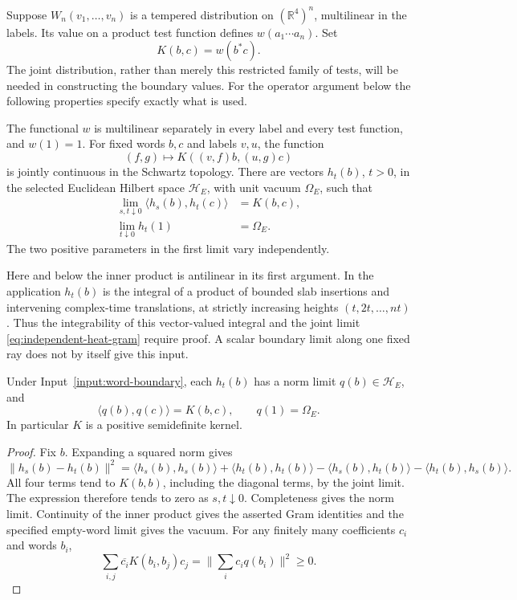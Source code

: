 Suppose $W_n(v_1,\ldots,v_n)$ is a tempered distribution on
$(\mathbb R^4)^n$, multilinear in the labels. Its value on a product test
function defines $w(a_1\cdots a_n)$. Set
\[
 K(b,c)=w(b^*c).
\]
The joint distribution, rather than merely this restricted family of tests,
will be needed in constructing the boundary values. For the operator argument
below the following properties specify exactly what is used.
\begin{assumption}\label{input:word-boundary}
The functional $w$ is multilinear separately in every label and every test
function, and $w(1)=1$. For fixed words $b,c$ and labels $v,u$, the function
\[
 (f,g)\longmapsto K((v,f)b,(u,g)c)
\]
is jointly continuous in the Schwartz topology. There are vectors
$h_t(b)$, $t>0$, in the selected Euclidean Hilbert space $\mathcal H_E$,
with unit vacuum $\Omega_E$, such that
\begin{align}
 \lim_{s,t\downarrow0}\langle h_s(b),h_t(c)\rangle&=K(b,c),
       \label{eq:independent-heat-gram}\\
 \lim_{t\downarrow0}h_t(1)&=\Omega_E.\nonumber
\end{align}
The two positive parameters in the first limit vary independently.
\end{assumption}
Here and below the inner product is antilinear in its first argument.
In the application $h_t(b)$ is the integral of a product of bounded slab
insertions and intervening complex-time translations, at strictly increasing
heights $(t,2t,\ldots,nt)$. Thus the integrability of this vector-valued
integral and the joint limit \eqref{eq:independent-heat-gram} require proof.
A scalar boundary limit along one fixed ray does not by itself give this input.

\begin{lemma}\label{lem:cold-vectors}
Under Input~\ref{input:word-boundary}, each $h_t(b)$ has a norm limit
$q(b)\in\mathcal H_E$, and
\[
 \langle q(b),q(c)\rangle=K(b,c),\qquad q(1)=\Omega_E.
\]
In particular $K$ is a positive semidefinite kernel.
\end{lemma}
\begin{proof}
Fix $b$. Expanding a squared norm gives
\[
 \|h_s(b)-h_t(b)\|^2
 =\langle h_s(b),h_s(b)\rangle+\langle h_t(b),h_t(b)\rangle
  -\langle h_s(b),h_t(b)\rangle-\langle h_t(b),h_s(b)\rangle.
\]
All four terms tend to $K(b,b)$, including the diagonal terms, by the joint
limit. The expression therefore tends to zero as $s,t\downarrow0$.
Completeness gives the norm limit. Continuity of the inner product gives the
asserted Gram identities and the specified empty-word limit gives the vacuum.
For any finitely many coefficients $c_i$ and words $b_i$,
\[
 \sum_{i,j}\overline{c_i}K(b_i,b_j)c_j
   =\Big\|\sum_i c_iq(b_i)\Big\|^2\geq0.
\]
\end{proof}

